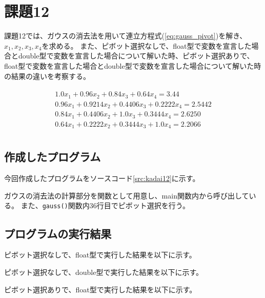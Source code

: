 \documentclass[11pt,titlepage]{jsarticle}
\begin{document}
\section{課題12}
課題12では、ガウスの消去法を用いて連立方程式(\ref{eq:gauss_pivot})を解き、$x_1, x_2, x_3, x_4$を求める。
また、ピボット選択なしで、float型で変数を宣⾔した場合とdouble型で変数を宣⾔した場合について解いた時、ピボット選択ありで、float型で変数を宣⾔した場合とdouble型で変数を宣⾔した場合について解いた時の結果の違いを考察する。


\begin{eqnarray}
\label{eq:gauss_pivot}
		\begin{array}{l}
			1.0x_1 + 0.96x_2 + 0.84x_3 + 0.64x_4 = 3.44\\
			0.96x_1 + 0.9214x_2 + 0.4406x_3 + 0.2222x_4 = 2.5442\\
			0.84x_1 + 0.4406x_2 + 1.0x_3 + 0.3444x_4 = 2.6250\\
			0.64x_1 + 0.2222x_2 + 0.3444x_3 + 1.0x_4 = 2.2066\\
		\end{array}
\end{eqnarray}

\subsection{作成したプログラム}
今回作成したプログラムをソースコード\ref{src:kadai12}に示す。


ガウスの消去法の計算部分を関数として用意し、main関数内から呼び出している。
また、{\tt gauss()}関数内36行目でピボット選択を行う。

\subsection{プログラムの実行結果}
ピボット選択なしで、float型で実行した結果を以下に示す。

\begin{oframed}
\end{oframed}

ピボット選択なしで、double型で実行した結果を以下に示す。

\begin{oframed}
\end{oframed}

ピボット選択ありで、float型で実行した結果を以下に示す。
\end{document}
